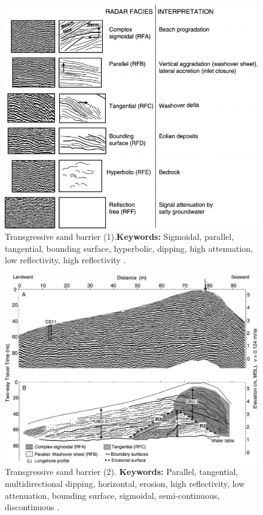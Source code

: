 \begin{figure}[h!]
    \centering
    \includegraphics[width=0.9\linewidth]{Figures/0.2GPR/Costas2006_trace_1.png}
    \caption[Transgressive sand barrier (1).]{Transgressive sand barrier (1).\textbf{Keywords: } Sigmoidal, parallel, tangential, bounding surface, hyperbolic, dipping, high attenuation, low reflectivity, high reflectivity \citep{Costas2006}.}
    \label{fig:Costas2006-1}
\end{figure}

\begin{landscape}
\begin{figure}[h!]
    \centering
    \includegraphics[width=0.8\linewidth]{Figures/0.2GPR/Costas2006_trace_2.png}
    \caption[Transgressive sand barrier (2).]{Transgressive sand barrier (2). \textbf{Keywords: } Parallel, tangential, multidirectional dipping, horizontal, erosion, high reflectivity, low attenuation, bounding surface, sigmoidal, semi-continuous, discontinuous \citep{Costas2006}.}
    \label{fig:Costas2006-2}
\end{figure}
\end{landscape}

